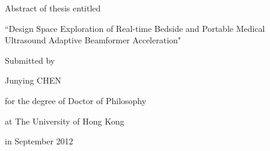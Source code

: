 
\begin{center}
\small Abstract of thesis entitled

\LARGE ``Design Space Exploration of Real-time Bedside and Portable Medical Ultrasound Adaptive Beamformer Acceleration"

\vspace{5mm}
\small Submitted by 

\large Junying CHEN

\vspace{5mm}
\small for the degree of Doctor of Philosophy

at The University of Hong Kong

in September 2012

\vspace{5mm}
\end{center}
